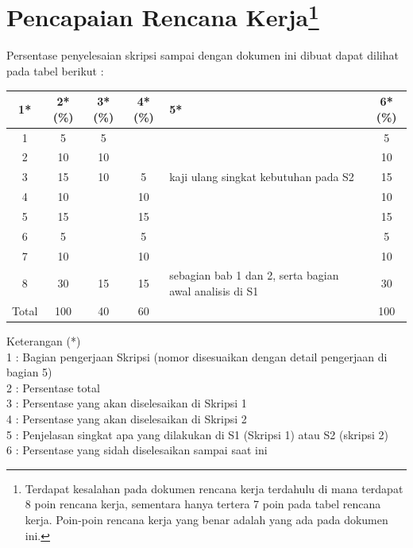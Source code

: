 \documentclass[a4paper,twoside]{article}
\begin{document}
\pagebreak

\section{Pencapaian Rencana Kerja\footnote{Terdapat kesalahan pada dokumen rencana kerja terdahulu di mana terdapat 8 poin rencana kerja, sementara hanya tertera 7 poin pada tabel rencana kerja. Poin-poin rencana kerja yang benar adalah yang ada pada dokumen ini.}}

Persentase penyelesaian skripsi sampai dengan dokumen ini dibuat dapat dilihat pada tabel berikut :

\begin{center}
  \begin{tabular}{ | c | c | c | c | l | c |}
    \hline
    1*  & 2*(\%) & 3*(\%) & 4*(\%) &5* &6*(\%)\\ \hline \hline
    1   & 5  & 5  &  &  & 5 \\ \hline
    2   & 10 & 10  &   &  & 10 \\ \hline
    3   & 15  & 10  & 5 & {\footnotesize kaji ulang singkat kebutuhan pada S2}  & 15  \\ \hline
    4   & 10  &  & 10 &  & 10 \\ \hline
    5   & 15  &   & 15 & & 15 \\ \hline
    6   & 5 &   & 5  & & 5 \\ \hline
    7   & 10 &   & 10  & & 10 \\ \hline
    8   & 30  & 15  & 15 & {\footnotesize sebagian bab 1 dan 2, serta bagian awal analisis di S1} & 30 \\ \hline
    Total  & 100  & 40  & 60 &  & 100\\ \hline
                          \end{tabular}
\end{center}

Keterangan (*)\\
1 : Bagian pengerjaan Skripsi (nomor disesuaikan dengan detail pengerjaan di bagian 5)\\
2 : Persentase total \\
3 : Persentase yang akan diselesaikan di Skripsi 1 \\
4 : Persentase yang akan diselesaikan di Skripsi 2 \\
5 : Penjelasan singkat apa yang dilakukan di S1 (Skripsi 1) atau S2 (skripsi 2)\\
6 : Persentase yang sidah diselesaikan sampai saat ini
\end{document}
